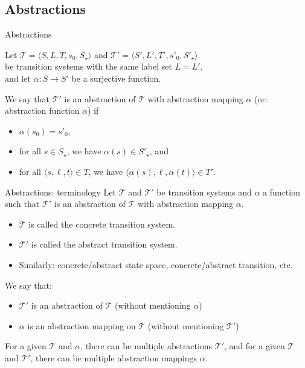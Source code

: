 \documentclass{gkibeamer}
\begin{document}
\subsection{Abstractions}

\begin{frame}{Abstractions}
  \begin{definition}
    Let $\mathcal T = \langle S, L, T, s_0, S_\star\rangle$ and
    $\mathcal T' = \langle S', L', T', s'_0, S'_\star\rangle$ \\
    be transition systems with the same label set $L = L'$, \\
    and let $\alpha: S \to S'$ be a \alert{surjective} function.

    \smallskip

    We say that $\mathcal T'$ is \alert{an abstraction of $\mathcal
      T$ with abstraction mapping $\alpha$} (or: \alert{abstraction
      function $\alpha$}) if
    \begin{itemize}
    \item $\alpha(s_0) = s'_0$,
    \item for all $s \in S_\star$, we have $\alpha(s) \in S'_\star$, and
    \item for all $\langle s, \ell, t\rangle \in T$, we have
      $\langle \alpha(s), \ell, \alpha(t)\rangle \in T'$.
    \end{itemize}
  \end{definition}
\end{frame}

\begin{frame}{Abstractions: terminology}
  Let $\mathcal T$ and $\mathcal T'$ be transition systems and
  $\alpha$ a function such that $\mathcal T'$ is an abstraction of
  $\mathcal T$ with abstraction mapping $\alpha$.
  \begin{itemize}
  \item $\mathcal T$ is called the \alert{concrete transition system}.
  \item $\mathcal T'$ is called the \alert{abstract transition
    system}.
  \item Similarly: \alert{concrete/abstract state space},
    \alert{concrete/abstract transition}, etc.
  \end{itemize}
  We say that:
  \begin{itemize}
  \item \alert{$\mathcal T'$ is an abstraction of $\mathcal T$}
    (without mentioning $\alpha$)
  \item \alert{$\alpha$ is an abstraction mapping on $\mathcal T$}
    (without mentioning $\mathcal T'$)
  \end{itemize}

  \medskip

   For a given $\mathcal T$ and $\alpha$, there can be
  multiple abstractions $\mathcal T'$, and for a given $\mathcal T$
  and $\mathcal T'$, there can be multiple abstraction mappings
  $\alpha$.
\end{frame}
\end{document}
